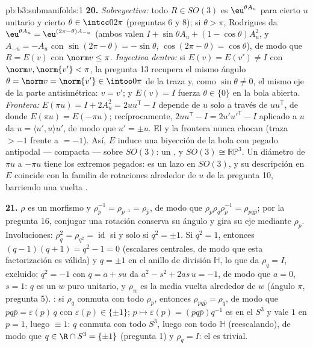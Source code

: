 \begin{solution}{pb:b3:submanifolds:1}
\textbf{20.} \emph{Sobreyectiva:} todo $R \in SO(3)$ es
$\eu^{\theta A_u}$ para cierto $u$ unitario y cierto $\theta \in
\intcc0{2\pi}$ (preguntas 6 y 8); si $\theta > \pi$, Rodrigues da
$\eu^{\theta A_u} = \eu^{(2\pi -
\theta)A_{-u}}$ (ambos valen $I + \sin\theta A_u + (1 -
\cos\theta)A_u^2$, y $A_{-u} = -A_u$ con $\sin(2\pi -
\theta) = -\sin\theta$, $\cos(2\pi - \theta) =
\cos\theta$), de modo que $R = E(v)$ con $\norm v \leq \pi$.
\emph{Inyectiva dentro:} si $E(v) = E(v') \neq I$ con
$\norm v, \norm{v'} < \pi$, la pregunta 13 recupera el mismo ángulo
$\theta = \norm v = \norm{v'} \in \intoo0\pi$ de la traza y, como
$\sin\theta \neq 0$, el mismo eje de la parte antisimétrica: $v = v'$; y
$E(v) = I$ fuerza $\theta \in \{0\}$ en la bola abierta.
\emph{Frontera:} $E(\pi u) = I + 2A_u^2 = 2uu^{\mathsf T} - I$ depende
de $u$ solo a través de $uu^{\mathsf T}$, de donde $E(\pi u) =
E(-\pi u)$; recíprocamente, $2uu^{\mathsf T} - I =
2u'u'^{\mathsf T} - I$ aplicado a $u$ da $u = \langle
u', u\rangle u'$, de modo que $u' = \pm u$. El
 y la frontera nunca chocan
(traza $> -1$ frente a $= -1$). Así, $E$ induce una biyección
 de la bola con pegado
antipodal --- compacta --- sobre
$SO(3)$: un , y $SO(3)
\cong \mathbb{RP}^3$. Un diámetro de $\pi u$ a $-\pi u$ tiene los
extremos pegados: es un lazo en $SO(3)$, y su descripción en $E$
coincide con la familia de rotaciones alrededor de $u$ de la pregunta
10, barriendo una vuelta .

\textbf{21.} $\rho$ es un morfismo y $\rho_p^{-1} =
\rho_{p^{-1}} = \rho_{\bar p}$, de modo que $\rho_p\rho_q\rho_p^{-1}
= \rho_{pq\bar p}$; por la pregunta 16, conjugar una rotación conserva
su ángulo y gira su eje mediante $\rho_p$. Involuciones:
$\rho_q^2 = \rho_{q^2} = \operatorname{id}$ si y solo si $q^2 = \pm1$.
Si $q^2 = 1$, entonces $(q - 1)(q + 1) = q^2 -
1 = 0$ (escalares centrales, de modo que esta factorización es válida) y
$q = \pm1$ en el anillo de división $\mathbb H$, lo que da $\rho_q
= I$, excluido; $q^2 = -1$ con $q = a +
su$ da $a^2 - s^2 + 2as\,u = -1$, de modo que $a = 0$, $s = 1$: $q$ es
un $w$ puro unitario, y $\rho_w$ es la media vuelta alrededor de $w$
(ángulo $\pi$, pregunta 5). : si
$\rho_q$ conmuta con todo $\rho_p$, entonces $\rho_{pq\bar p} = \rho_q$,
de modo que $pq\bar p = \varepsilon(p)\,q$ con $\varepsilon(p) \in
\{\pm1\}$; $p \mapsto \varepsilon(p) = (pq\bar p)q^{-1}$ es
 en el
 $S^3$ y vale $1$ en $p =
1$, luego $\equiv 1$: $q$ conmuta con todo $S^3$, luego con todo
$\mathbb H$ (reescalando), de modo que $q \in \R \cap S^3 =
\{\pm1\}$ (pregunta 1) y $\rho_q = I$: el
 es trivial.


\end{solution}

